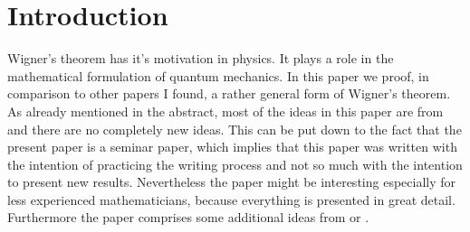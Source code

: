 \section{Introduction}

Wigner's theorem has it's motivation in physics. It plays a role in the mathematical formulation of quantum mechanics. In this paper we proof, in comparison to other papers I found, a rather general form of Wigner's theorem. As already mentioned in the abstract, most of the ideas in this paper are from \cite{spiegel2018constructive} and there are no completely new ideas. This can be put down to the fact that the present paper is a seminar paper, which implies that this paper was written with the intention of practicing the writing process and not so much with the intention to present new results. Nevertheless the paper might be interesting especially for less experienced mathematicians, because everything is presented in great detail. Furthermore the paper comprises some additional ideas from \cite{Geh_r_2014} or \cite{Bargmann_1964}. 




